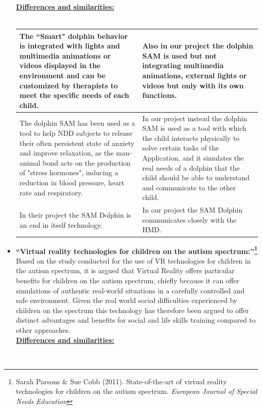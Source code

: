 \documentclass [12pt]{article}
\begin{document}
\begin{itemize}[•]
 \underline{\textbf{Differences and similarities:}}\\\\
 \begin{tabular}{|p{7cm}|p{7cm}|}
\hline
The “Smart" dolphin behavior is integrated with lights and multimedia animations or videos displayed in the environment and can be customized by therapists to meet the specific needs of each child.&Also in our project the dolphin SAM is used but not integrating multimedia animations, external lights or videos but only with its own functions.\\
\hline
The dolphin SAM has been used as a tool to help NDD subjects to release their often persistent state of anxiety and improve relaxation, as the man-animal bond acts on the production of "stress hormones", inducing a reduction in blood pressure, heart rate and respiratory. & In our project instead the dolphin SAM is used as a tool with which the child interacts physically to solve certain tasks of the Application, and it simulates the real needs of a dolphin that the child should be able to understand and communicate to the other child.\\
\hline
In their project the SAM Dolphin is an end in itself technology. & In our project the SAM Dolphin communicates closely with the HMD.\\
\hline
\end{tabular}
\clearpage
\item \textbf{``Virtual reality technologies for children on the autism spectrum:''\footnote{Sarah Parsons \& Sue Cobb (2011). State-of-the-art of virtual reality technologies for children on the autism spectrum. \textit{European Journal of Special Needs Education}}}\\
Based on the study conducted for the use of VR technologies for children in the autism spectrum, it is argued that Virtual Reality offers particular benefits for children on the autism spectrum, chiefly because it can offer simulations of authentic real-world situations in a carefully controlled and safe environment. Given the real world social difficulties experienced by children on the spectrum this technology has therefore been argued to offer distinct advantages and benefits for social and life skills training compared to other approaches.\\
\underline{\textbf{Differences and similarities:}}\\\\
 \begin{tabular}{|p{7cm}|p{7cm}|}
\hline

\end{tabular}
\end{itemize}
\end{document}
